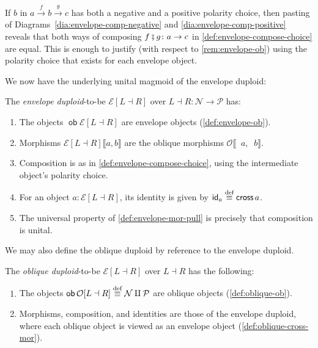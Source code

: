 \documentclass[runningheads]{llncs}
\newcommand*\rocqlogo{\usebox{\rocqlogobox}}
\newcommand{\lemmaref}[3]{\href{https://github.com/UniMath/UniMath/blob/94fae0eda57a778cec704bfa73b4ff525c9bc475/#1\#L#2?name=#3}{\rocqlogo}}
\newcommand{\acat}[1]{\mathcal{#1}}
\newcommand{\PP}{\acat{P}}
\newcommand{\NN}{\acat{N}}
\newcommand{\OO}{\acat{O}}
\newcommand{\EE}{\acat{E}}
\newcommand{\Obl}[1]{\OO[#1]}
\newcommand{\Env}[1]{\EE[#1]}
\DeclareMathOperator{\ob}{\mathsf{ob}}
\newcommand{\id}{\mathsf{id}}
\newcommand{\dcomp}{\fatsemi}
\newcommand{\morsof}[3]{{#1}\llbracket{#2},{#3}\rrbracket}
\newcommand{\defequiv}{\overset{\mathrm{\textup{def}}}{\equiv}}
\newcommand{\projneg}{\mathop{\pi^{\ominus}}}
\newcommand{\projpos}{\mathop{\pi^{\oplus}}}
\newcommand{\crossmor}{\mathop{\mathsf{cross}}}
\begin{document}
\begin{remark}[{\lemmaref{UniMath/CategoryTheory/Nonassociative/Duploids/FromAdjunction/Envelope.v}{229}{envelope\_compose\_irrel}}]
\label{thm:envelope-compose-irrel}
If \(b\) in \(a \xrightarrow{f} b \xrightarrow{g} c\) has both a
negative and a positive polarity choice, then pasting of
Diagrams~\ref{dia:envelope-comp-negative} and
\ref{dia:envelope-comp-positive} reveals that both ways of composing
\(f \dcomp g \colon a \to c\) in \autoref{def:envelope-compose-choice} are
equal. This is enough to justify (with respect to \autoref{rem:envelope-ob})
using the polarity choice that exists for each envelope object.
\end{remark}

We now have the underlying unital magmoid of the envelope
duploid:

\begin{definition}[{\lemmaref{UniMath/CategoryTheory/Nonassociative/Duploids/FromAdjunction/Envelope.v}{398}{envelope\_unital\_magmoid}}]
\label{def:envelope-umagmoid}
The \emph{envelope duploid}-to\hyp{}be \(\Env{L \dashv R}\) over \(L \dashv
R : \NN \to \PP\) has:
\begin{enumerate}
\item The objects \(\ob\Env{L \dashv R}\) are envelope objects (\autoref{def:envelope-ob}).
\item Morphisms \(\morsof{\Env{L \dashv R}}{a}{b}\) are the oblique
morphisms \(\morsof\OO{\projpos{a}}{\projneg{b}}\).
\item Composition is as in \autoref{def:envelope-compose-choice}, using the
intermediate object's polarity choice.
\item For an object \(a : \Env{L \dashv R}\), its identity is given by
\(\id_{a} \defequiv \crossmor{a}\).
\item The universal property of \autoref{def:envelope-mor-pull} is precisely
that composition is unital.
\end{enumerate}
\end{definition}

We may also define the oblique duploid by reference to the envelope duploid.

\begin{definition}[{\lemmaref{UniMath/CategoryTheory/Nonassociative/Duploids/FromAdjunction/Oblique.v}{90}{oblique\_unital\_magmoid}}]
\label{def:oblique-umagmoid}
The \emph{oblique duploid}-to\hyp{}be \(\Env{L \dashv R}\) over \(L \dashv
R\) has the following:
\begin{enumerate}
\item The objects \(\ob\Obl{L \dashv R} \defequiv \NN \amalg \PP\) are
oblique objects (\autoref{def:oblique-ob}).
\item Morphisms, composition, and identities are those of the envelope
duploid, where each oblique object is viewed as an envelope object
(\autoref{def:oblique-cross-mor}).
\end{enumerate}
\end{definition}
\end{document}
